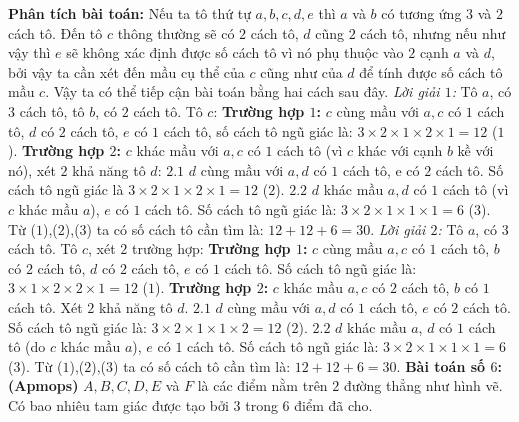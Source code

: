 \begin{multicols}{2}
\begin{figure}[H]
			\vspace*{-5pt}
		\end{figure}
		\textbf{\color{toancuabi}Phân tích bài toán:} Nếu ta tô thứ tự $a,b,c,d,e$ thì $a$ và $b$ có tương ứng $3$ và $2$ cách tô. Đến tô $c$ thông thường sẽ có $2$ cách tô, $d$ cũng $2$ cách tô, nhưng nếu như vậy thì $e$ sẽ không xác định được số cách tô vì nó phụ thuộc vào $2$ cạnh $a$ và $d$, bởi vậy ta cần xét đến mầu cụ thể của $c$ cũng như của $d$ để tính được số cách tô mầu $c$. Vậy ta có thể tiếp cận bài toán bằng hai cách sau đây.
		\vskip 0.1cm
		\textit{Lời giải $1$:}
		\vskip 0.1cm
		Tô $a$, có $3$ cách tô, tô $b$, có $2$ cách tô.
		\vskip 0.1cm
		Tô $c$:
		\vskip 0.1cm
		\textbf{\color{toancuabi}Trường hợp $1$:} $c$ cùng mầu với $a, c$ có $1$ cách tô, $d$ có $2$ cách tô, $e$ có $1$ cách tô, số cách tô ngũ giác là: $3\times2\times1\times2\times1=12$ ($1$).
		\vskip 0.1cm
		\textbf{\color{toancuabi}Trường hợp $2$:} $c$ khác mầu với $a, c$ có $1$ cách tô (vì $c$ khác với cạnh $b$ kề với nó), xét $2$ khả năng tô $d$:
		\vskip 0.1cm
		$2.1$ $d$ cùng mầu với $a, d$ có $1$ cách tô, e có $2$ cách tô. Số cách tô ngũ giác là $3\times2\times1\times2\times1=12$ ($2$).
		\vskip 0.1cm
		$2.2$ $d$ khác mầu $a, d$ có $1$ cách tô (vì $c$ khác mầu $a$), $e$ có $1$ cách tô. Số cách tô ngũ giác là: $3\times2\times1\times1\times1=6$ ($3$).
		\vskip 0.1cm
		Từ ($1$),($2$),($3$) ta có số cách tô cần tìm là: $12+12+6=30$.
	\vskip 0.1cm
	\textit{Lời giải $2$:}
	\vskip 0.1cm
	Tô $a$, có $3$ cách tô. Tô $c$, xét $2$ trường hợp:
	\vskip 0.1cm
	\textbf{\color{toancuabi}Trường hợp $1$:} $c$ cùng mầu $a, c$ có $1$ cách tô, $b$ có $2$ cách tô, $d$ có $2$ cách tô, $e$ có $1$ cách tô. Số cách tô ngũ giác là: $3\times1\times2\times2\times1=12$ ($1$).
	\vskip 0.1cm
	\textbf{\color{toancuabi}Trường hợp $2$:} $c$ khác mầu $a, c$ có $2$ cách tô, $b$ có $1$ cách tô. Xét $2$ khả năng tô $d$.
	\vskip 0.1cm
	$2.1$ $d$ cùng mầu với $a, d$ có $1$ cách tô, $e$ có $2$ cách tô. Số cách tô ngũ giác là: $3\times2\times1\times1\times2=12$ ($2$).
	\vskip 0.1cm
	$2.2$ $d$ khác mầu $a$, $d$ có $1$ cách tô (do $c$ khác mầu $a$), $e$ có $1$ cách tô. Số cách tô ngũ giác là: $3\times2\times1\times1\times1=6$ ($3$).
	\vskip 0.1cm
	Từ ($1$),($2$),($3$) ta có số cách tô cần tìm là: $12+12+6=30$.
	\vskip 0.1cm
		\textbf{\color{toancuabi}Bài toán số $6$: (Apmops)}
		\vskip 0.1cm
		$A,B,C,D,E$ và $F$ là các điểm nằm trên $2$ đường thẳng như hình vẽ. Có bao nhiêu tam giác được tạo bởi $3$ trong $6$ điểm đã cho.

\end{multicols}
